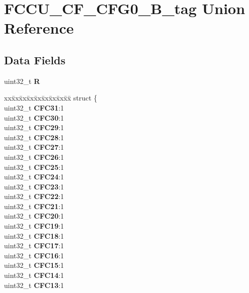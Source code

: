 \hypertarget{unionFCCU__CF__CFG0__32B__tag}{}\section{F\+C\+C\+U\+\_\+\+C\+F\+\_\+\+C\+F\+G0\+\_\+B\+\_\+tag Union Reference}
\label{unionFCCU__CF__CFG0__32B__tag}
\subsection*{Data Fields}
\begin{DoxyCompactItemize}
\item 
\mbox{\label{unionFCCU__CF__CFG0__32B__tag_a22154945f809b5d436a90abade2366a9}} 
uint32\+\_\+t {\bfseries R}
\item 
\mbox{\label{unionFCCU__CF__CFG0__32B__tag_a2e8c98f618861f382779565adb2c96f6}} 
\begin{tabbing}
xx\=xx\=xx\=xx\=xx\=xx\=xx\=xx\=xx\=\kill
struct \{\\
\>uint32\_t {\bfseries CFC31}:1\\
\>uint32\_t {\bfseries CFC30}:1\\
\>uint32\_t {\bfseries CFC29}:1\\
\>uint32\_t {\bfseries CFC28}:1\\
\>uint32\_t {\bfseries CFC27}:1\\
\>uint32\_t {\bfseries CFC26}:1\\
\>uint32\_t {\bfseries CFC25}:1\\
\>uint32\_t {\bfseries CFC24}:1\\
\>uint32\_t {\bfseries CFC23}:1\\
\>uint32\_t {\bfseries CFC22}:1\\
\>uint32\_t {\bfseries CFC21}:1\\
\>uint32\_t {\bfseries CFC20}:1\\
\>uint32\_t {\bfseries CFC19}:1\\
\>uint32\_t {\bfseries CFC18}:1\\
\>uint32\_t {\bfseries CFC17}:1\\
\>uint32\_t {\bfseries CFC16}:1\\
\>uint32\_t {\bfseries CFC15}:1\\
\>uint32\_t {\bfseries CFC14}:1\\
\>uint32\_t {\bfseries CFC13}:1\\

\end{tabbing}
\end{DoxyCompactItemize}
